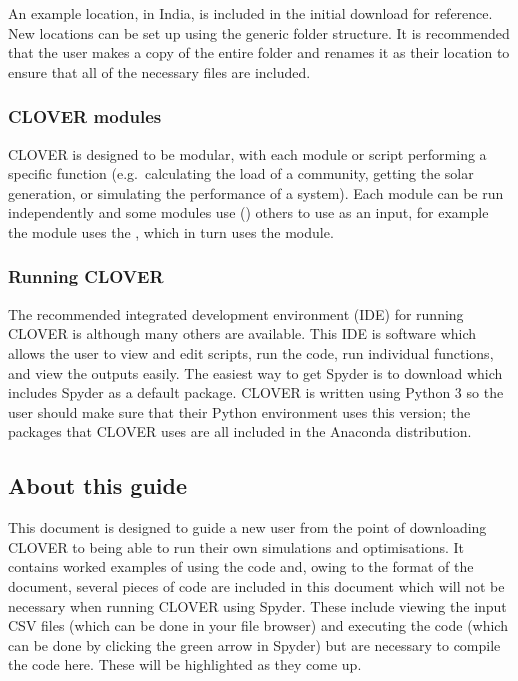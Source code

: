 \documentclass[letterpaper,10pt,english]{sphinxmanual}
\begin{document}
\sphinxAtStartPar
An example location,  in India, is included in the initial
download for reference. New locations can be set up using the generic
 folder structure. It is recommended that the user makes a
copy of the entire  folder and renames it as their
location to ensure that all of the necessary files are included.


\subsubsection{CLOVER modules}
\label{\detokenize{overview:clover-modules}}
\sphinxAtStartPar
CLOVER is designed to be modular, with each module or script performing
a specific function (e.g. calculating the load of a community, getting
the solar generation, or simulating the performance of a system). Each
module can be run independently and some modules use () others
to use as an input, for example the  module uses the
, which in turn uses the  module.


\subsubsection{Running CLOVER}
\label{\detokenize{overview:running-clover}}
\sphinxAtStartPar
The recommended integrated development environment (IDE) for running
CLOVER is  although many others
are available. This IDE is software which allows the user to view and
edit scripts, run the code, run individual functions, and view the
outputs easily. The easiest way to get Spyder is to download
 which includes
Spyder as a default package. CLOVER is written using Python 3 so the
user should make sure that their Python environment uses this version;
the packages that CLOVER uses are all included in the Anaconda
distribution.


\subsection{About this guide}
\label{\detokenize{overview:about-this-guide}}
\sphinxAtStartPar
This document is designed to guide a new user from the point of
downloading CLOVER to being able to run their own simulations and
optimisations. It contains worked examples of using the code and, owing
to the format of the document, several pieces of code are included in
this document which will not be necessary when running CLOVER using
Spyder. These include viewing the input CSV files (which can be done in
your file browser) and executing the code (which can be done by clicking
the green arrow in Spyder) but are necessary to compile the code here.
These will be highlighted as they come up.
\end{document}
